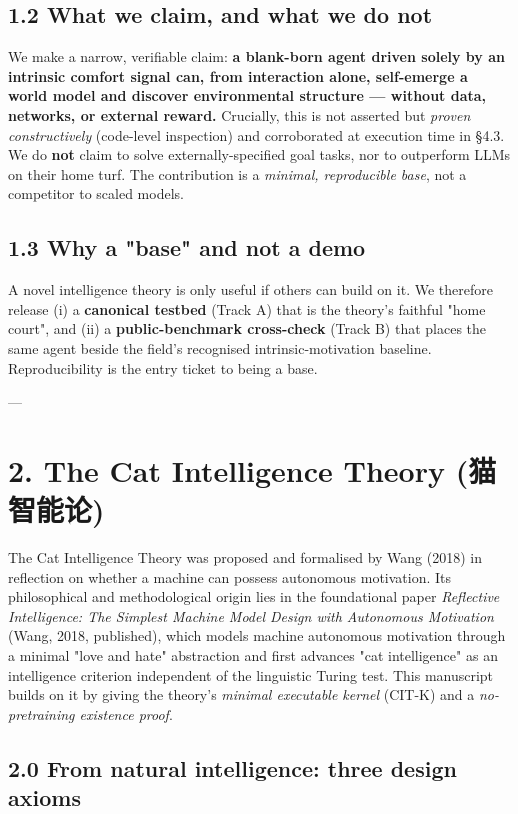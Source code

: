 \documentclass[11pt]{article}
\begin{document}
\subsection{1.2 What we claim, and what we do not}
We make a narrow, verifiable claim: \textbf{a blank-born agent driven solely by an intrinsic comfort signal can, from interaction alone, self-emerge a world model and discover environmental structure — without data, networks, or external reward.} Crucially, this is not asserted but \emph{proven constructively} (code-level inspection) and corroborated at execution time in §4.3. We do \textbf{not} claim to solve externally-specified goal tasks, nor to outperform LLMs on their home turf. The contribution is a \emph{minimal, reproducible base}, not a competitor to scaled models.

\subsection{1.3 Why a "base" and not a demo}
A novel intelligence theory is only useful if others can build on it. We therefore release (i) a \textbf{canonical testbed} (Track A) that is the theory's faithful "home court", and (ii) a \textbf{public-benchmark cross-check} (Track B) that places the same agent beside the field's recognised intrinsic-motivation baseline. Reproducibility is the entry ticket to being a base.

---

\section{2. The Cat Intelligence Theory (猫智能论)}

The Cat Intelligence Theory was proposed and formalised by Wang (2018) in reflection on whether a machine can possess autonomous motivation. Its philosophical and methodological origin lies in the foundational paper \emph{Reflective Intelligence: The Simplest Machine Model Design with Autonomous Motivation} (Wang, 2018, published), which models machine autonomous motivation through a minimal "love and hate" abstraction and first advances "cat intelligence" as an intelligence criterion independent of the linguistic Turing test. This manuscript builds on it by giving the theory's \emph{minimal executable kernel} (CIT-K) and a \emph{no-pretraining existence proof}.

\subsection{2.0 From natural intelligence: three design axioms}
\end{document}
